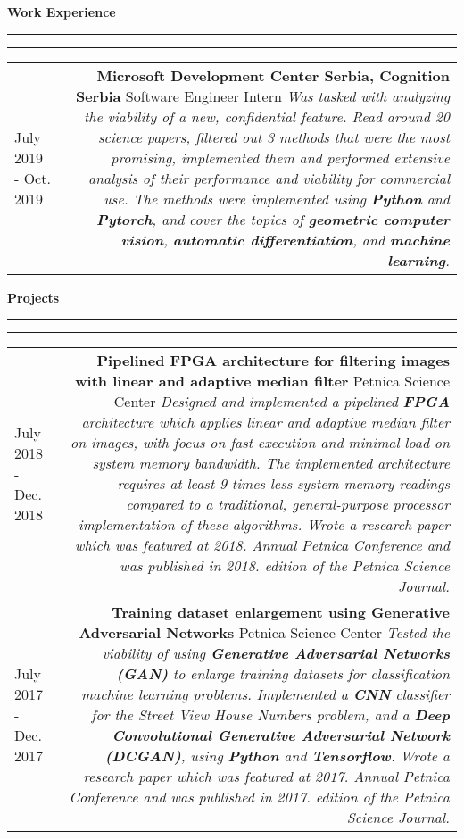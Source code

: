 \documentclass{article}
\newcommand{\mainitem}[3] {
    \textbf{#1}  \newline #2 \vskip5pt  \textit{#3} 
    \vspace{6pt}    %
}
\newenvironment{cvtable} {
	\hspace{-20pt} \begin{tabular}{L!{\color{line_color}\vrule width 1pt}D} %
} 
{\end{tabular}}
\renewcommand{\section}[1] {
    \vspace{15pt}   %
	{\color{main_color} \Large \textbf {#1}}
	{\color{line_color} \vskip-5pt \rule{\linewidth}{0.5mm}\hfill\vskip-11pt\rule{\linewidth}{0.2pt}}
	\vskip10pt  %
}
\begin{document}
    
    \section{Work Experience}
    	\begin{cvtable}
    	    \hspace{5pt} July 2019 - Oct. 2019  & 
    			\mainitem
    			    {Microsoft Development Center Serbia, Cognition Serbia}
    				{Software Engineer Intern} {
    				    Was tasked with analyzing the viability of a new, confidential feature.
    					Read around 20 science papers, filtered out 3 methods that were the most promising, implemented them and performed extensive analysis of their performance and viability for commercial use. The methods were implemented using \textbf{Python} and \textbf{Pytorch}, and cover the topics of \textbf{geometric computer vision}, \textbf{automatic differentiation}, and \textbf{machine learning}.
    				}
    	\end{cvtable}
    
    \section{Projects}
    	\begin{cvtable}
    	    \hspace{5pt} July 2018 - Dec. 2018 & 
    			\mainitem
    			    {Pipelined FPGA architecture for filtering images with linear and adaptive median filter}
    			    {Petnica Science Center} 
    			    {
    			        Designed and implemented a pipelined \textbf{FPGA} architecture which applies linear and adaptive median filter on images, with focus on fast execution and minimal load on system memory bandwidth. The implemented architecture requires at least 9 times less system memory readings compared to a traditional, general-purpose processor implementation of these algorithms. Wrote a research paper which was featured at 2018. Annual Petnica Conference and was published in 2018. edition of the Petnica Science Journal.
                    } 
    	    \\
    		\hspace{5pt} July 2017 - Dec. 2017 & 
    			\mainitem
    			    {Training dataset enlargement using Generative Adversarial Networks}
    			    {Petnica Science Center} 
    			    {
    			        Tested the viability of using \textbf{Generative Adversarial Networks (GAN)} to enlarge training datasets for classification machine learning problems. Implemented a \textbf{CNN} classifier for the Street View House Numbers problem, and a \textbf{Deep Convolutional Generative Adversarial Network (DCGAN)}, using \textbf{Python} and \textbf{Tensorflow}. Wrote a research paper which was featured at 2017. Annual Petnica Conference and was published in 2017. edition of the Petnica Science Journal.
                    }
    	\end{cvtable}
    	
\end{document}
